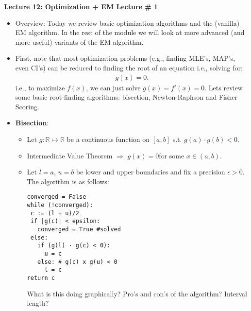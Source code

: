 \documentclass[11pt]{article}
\begin{document}
\textbf{Lecture 12: Optimization + EM Lecture \# 1}

\begin{itemize}

\item Overview: Today we review basic optimization algorithms and the (vanilla) EM algorithm. In the rest of the module we will look at more advanced (and more useful) variants of the EM algorithm. 

\item First, note that most optimization problems (e.g., finding MLE's, MAP's, even CI's) can be reduced to finding the root of an equation i.e., solving for:
\begin{align*}
 g(x) = 0 .
\end{align*}
i.e., to maximize $f(x)$, we can just solve $g(x)=f'(x)=0$. Lets review some basic root-finding algorithms: bisection, Newton-Raphson and Fisher Scoring.

\item \textbf{Bisection}:
\begin{itemize}
\item Let $g:\mathbb{R}\mapsto\mathbb{R}$ be a continuous function on $[a,b]$ s.t. $g(a)\cdot{}g(b)<0$.
\item Intermediate Value Theorem $\Rightarrow$ $g(x) = 0 $for some $x \in (a, b)$.
\item Let $l=a$, $u=b$ be lower and upper boundaries and fix a precision $\epsilon>0$. The algorithm is as follows:
\begin{verbatim}
converged = False
while (!converged):
 c := (l + u)/2
 if |g(c)| < epsilon:
   converged = True #solved
 else:
   if (g(l) · g(c) < 0):
     u = c
   else: # g(c) x g(u) < 0
     l = c     
return c
\end{verbatim}
What is this doing graphically? Pro's and con's of the algorithm? Interval length?
\end{itemize}


\end{itemize}
\end{document}
